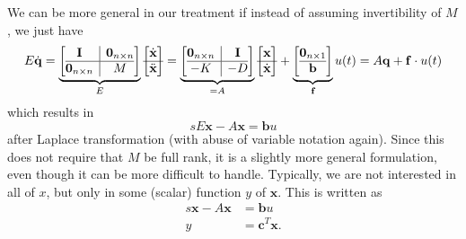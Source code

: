 \documentclass{article}
\begin{document}
	We can be more general in our treatment if instead of assuming invertibility of $M$, we just have 
	\begin{equation}\label{eq:equivFirstOrder-generalized}
		E \dot{\mathbf{q}} = \underbrace{\left[\begin{array}{@{}c|c@{}}
				\textbf{I} & \textbf{0}_{n\times n} \\\hline \textbf{0}_{n\times n} & M
			\end{array}\right]}_{E} \begin{bmatrix}
			\dot{\textbf{x}} \\\hline \ddot{\textbf{x}}
		\end{bmatrix} =
		\underbrace{\left[\begin{array}{@{}c|c@{}}
				\textbf{0}_{n\times n} & \textbf{I} \\\hline - K & - D
			\end{array}\right]}_{=A} 
		\begin{bmatrix}
			{\textbf{x}} \\\hline \dot{\textbf{x}}
		\end{bmatrix}
		+ \underbrace{\left[\begin{array}{@{}c@{}}
				\textbf{0}_{n\times 1}  \\\hline  \textbf{b}
			\end{array}\right]}_{\textbf{f}} u(t)
		= A\mathbf{q}+\mathbf{f}\cdot u(t)
	\end{equation}
	which results in 
		\begin{equation}\label{eq:LaplaceXE}
			sE\mathbf{x}-A\mathbf{x}=\mathbf{b}u
		\end{equation}
		after Laplace transformation (with abuse of variable notation again). Since this does not require that $M$ be full rank, it is a slightly more general formulation, even though it can be more difficult to handle.
	Typically, we are not interested in all of $x$, but only in some (scalar) function $y$ of $\mathbf{x}$. This is written as
	\begin{equation}\label{eq:stateSpace-again}
		\begin{aligned}
			s\mathbf{x}-A\mathbf{x}&=\mathbf{b}u\\
			y&=\mathbf{c}^T\mathbf{x}.
		\end{aligned} 
	\end{equation}
\end{document}
